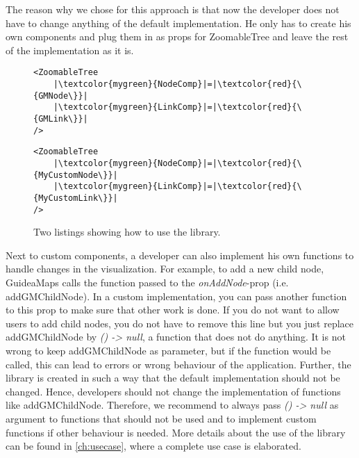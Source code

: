 The reason why we chose for this approach is that now the developer does not have to change anything of the default implementation. He only has to create his own components and plug them in as props for ZoomableTree and leave the rest of the implementation as it is.\\

\begin{figure}[H]
	\begin{minipage}{0.5\textwidth}
 		 \centering
		 \begin{verbatim}
<ZoomableTree
    |\textcolor{mygreen}{NodeComp}|=|\textcolor{red}{\{GMNode\}}|
    |\textcolor{mygreen}{LinkComp}|=|\textcolor{red}{\{GMLink\}}|
/>
		\end{verbatim}
		\label{lst:default-components}
	\end{minipage}
 	\begin{minipage}{0.5\textwidth}
  		\centering
  		\begin{verbatim}
<ZoomableTree
    |\textcolor{mygreen}{NodeComp}|=|\textcolor{red}{\{MyCustomNode\}}|
    |\textcolor{mygreen}{LinkComp}|=|\textcolor{red}{\{MyCustomLink\}}|
/>
		\end{verbatim}
		\label{lst:custom-components}
 	\end{minipage}
	\caption{Two listings showing how to use the library.}
	\label{fig:examplecode-library}
\end{figure}

Next to custom components, a developer can also implement his own functions to handle changes in the visualization. For example, to add a new child node, GuideaMaps calls the function passed to the \textit{onAddNode}-prop (i.e. addGMChildNode). In a custom implementation, you can pass another function to this prop to make sure that other work is done. If you do not want to allow users to add child nodes, you do not have to remove this line but you just replace addGMChildNode by \textit{() -> null}, a function that does not do anything. It is not wrong to keep addGMChildNode as parameter, but if the function would be called, this can lead to errors or wrong behaviour of the application. Further, the library is created in such a way that the default implementation should not be changed. Hence, developers should not change the implementation of functions like addGMChildNode. Therefore, we recommend to always pass \textit{() -> null} as argument to functions that should not be used and to implement custom functions if other behaviour is needed. More details about the use of the library can be found in \autoref{ch:usecase}, where a complete use case is elaborated.



